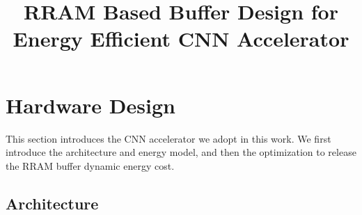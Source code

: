 \documentclass[10pt, conference]{IEEEtran}
\begin{document}
    
    \title{\Large\textbf{RRAM Based Buffer Design for Energy Efficient CNN Accelerator}}
    
    \author{
    }
    
    \maketitle
    
        
    
    
    
    
    
    \section{Hardware Design}
    This section introduces the CNN accelerator we adopt in this work. We first introduce the architecture and energy model, and then the optimization to release the RRAM buffer dynamic energy cost.
    
    \subsection{Architecture}
    
\end{document}
